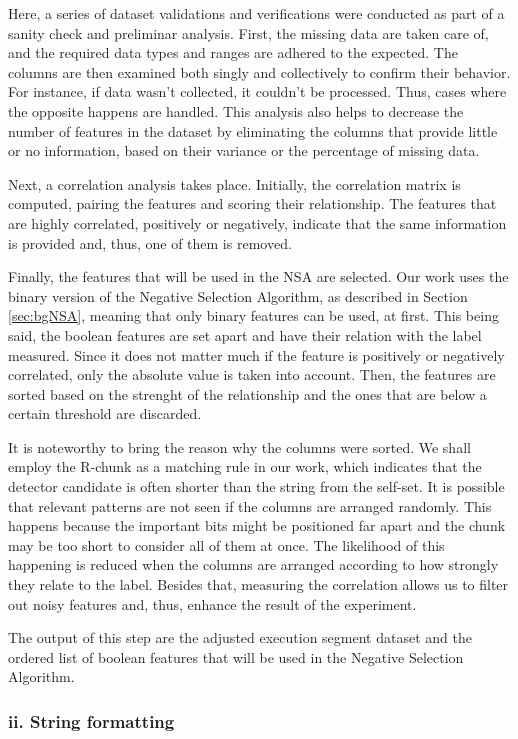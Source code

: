 Here, a series of dataset validations and verifications were conducted as part of a sanity check and preliminar analysis. First, the missing data are taken care of, and the required data types and ranges are adhered to the expected. The columns are then examined both singly and collectively to confirm their behavior. For instance, if data wasn't collected, it couldn't be processed. Thus, cases where the opposite happens are handled. This analysis also helps to decrease the number of features in the dataset by eliminating the columns that provide little or no information, based on their variance or the percentage of missing data.

Next, a correlation analysis takes place. Initially, the correlation matrix is computed, pairing the features and scoring their relationship. The features that are highly correlated, positively or negatively, indicate that the same information is provided and, thus, one of them is removed.

Finally, the features that will be used in the NSA are selected. Our work uses the binary version of the Negative Selection Algorithm, as described in Section \ref{sec:bgNSA}, meaning that only binary features can be used, at first. This being said, the boolean features are set apart and have their relation with the label measured. Since it does not matter much if the feature is positively or negatively correlated, only the absolute value is taken into account. Then, the features are sorted based on the strenght of the relationship and the ones that are below a certain threshold are discarded.

It is noteworthy to bring the reason why the columns were sorted. We shall employ the R-chunk as a matching rule in our work, which indicates that the detector candidate is often shorter than the string from the self-set. It is possible that relevant patterns are not seen if the columns are arranged randomly. This happens because the important bits might be positioned far apart and the chunk may be too short to consider all of them at once. The likelihood of this happening is reduced when the columns are arranged according to how strongly they relate to the label. Besides that, measuring the correlation allows us to filter out noisy features and, thus, enhance the result of the experiment.

The output of this step are the adjusted execution segment dataset and the ordered list of boolean features that will be used in the Negative Selection Algorithm. 

\subsubsection{ii. String formatting}

